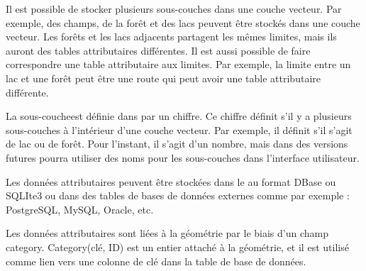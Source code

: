 
Il est possible de stocker plusieurs sous-couches dans une couche vecteur. Par exemple, des champs, de la forêt et des lacs peuvent être stockés dans une couche vecteur. Les forêts et les lacs adjacents partagent les mêmes limites, mais ils auront des tables attributaires différentes. Il est aussi possible de faire correspondre une table attributaire aux limites. Par exemple, la limite entre un lac et une forêt peut être une route qui peut avoir une table attributaire différente.


La \og sous-couche\fg est définie dans \grass par un chiffre. Ce chiffre définit s'il y a plusieurs sous-couches à l'intérieur d'une couche vecteur. Par exemple, il définit s'il s'agit de lac ou de forêt. Pour l'instant, il s'agit d'un nombre, mais dans des versions futures \grass pourra utiliser des noms pour les sous-couches dans l'interface utilisateur.

Les données attributaires peuvent être stockées dans le  au format DBase ou SQLIte3 ou dans des tables de bases de données externes comme par exemple : PostgreSQL, MySQL, Oracle, etc.


Les données attributaires sont liées à la géométrie par le biais d'un champ \og category\fg. \og Category\fg (clé, ID) est un entier attaché à la géométrie, et il est utilisé comme lien vers une colonne de clé dans la table de base de données.

